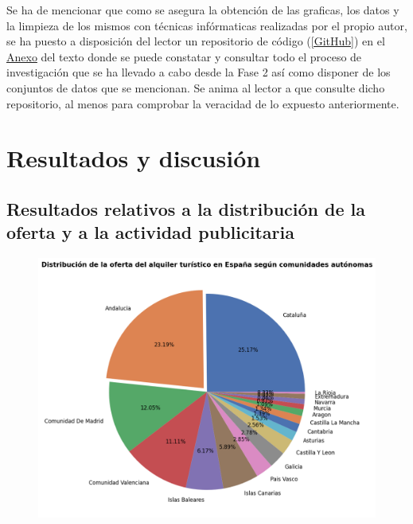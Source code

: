 \documentclass[a4paper,10pt]{article}
\begin{document}
\begin{multicols}{2}
            \noindent
            Se ha de mencionar que como se asegura la obtención de las graficas, los datos y la limpieza de los mismos con técnicas infórmaticas realizadas por el 
            propio autor, se ha puesto a disposición del lector un repositorio de código (\hyperlink{github}{[GitHub]}) en el \hyperlink{anexo}{Anexo} 
            del texto donde se puede constatar y consultar todo el proceso de investigación que se ha llevado a cabo desde la Fase 2 así como disponer de los conjuntos de datos que se mencionan. Se anima al lector a que consulte dicho repositorio, al menos para comprobar la veracidad de lo expuesto     anteriormente.

    \end{multicols}
        
    \section{Resultados y discusión}


        \subsection{Resultados relativos a la distribución de la oferta y a la actividad publicitaria}
            
            \begin{figure}[h]
                \centering
                \includegraphics*[width = 15cm]{graphics/spainccaadensity.png}
            \end{figure}
\end{document}
